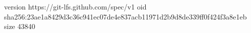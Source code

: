 version https://git-lfs.github.com/spec/v1
oid sha256:23ae1a8429d3c36c941ec07de4e837acb11971d2b9d8de339ff0f424f3a8e1eb
size 43840
